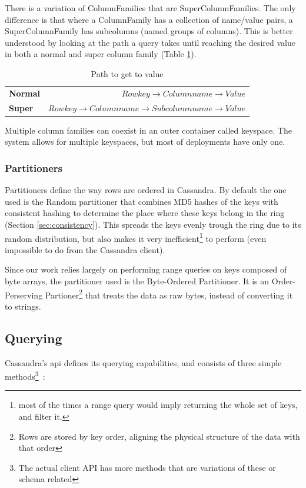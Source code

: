 There is a variation of ColumnFamilies that are SuperColumnFamilies. The only difference is that where a ColumnFamily has a collection of name/value pairs, a SuperColumnFamily has subcolumns (named groups of columns). This is better understood by looking at the path a query takes until reaching the desired value in both a normal and super column family (Table \ref{tab:path}).

\begin{table}[h!]
\centering
  \begin{tabular}{@{}p{4cm}  r@{}}
	\toprule
	\textbf{Normal} & $Row key \rightarrow Column name \rightarrow Value$\\
    \textbf{Super}  & $Row key \rightarrow Column name \rightarrow Subcolumn name \rightarrow Value$\\
    \bottomrule
  \end{tabular}

\caption{Path to get to value}
\label{tab:path}
\end{table}

Multiple column families can coexist in an outer container called keyspace. The system allows for multiple keyspaces, but most of deployments have only one.

\subsubsection{Partitioners}
\label{sec:partitioners}

Partitioners define the way rows are ordered in Cassandra. By default the one used is the Random partitioner that combines MD5 hashes of the keys with consistent hashing to determine the place where these keys belong in the ring (Section \ref{sec:consistency}). This spreads the keys evenly trough the ring due to its random distribution, but also makes it very inefficient\footnote{most of the times a range query would imply returning the whole set of keys, and filter it.} to perform (even impossible to do from the Cassandra client). 

Since our work relies largely on performing range queries on keys composed of byte arrays, the partitioner used is the Byte-Ordered Partitioner. It is an Order-Perserving Partioner\footnote{Rows are stored by key order, aligning the physical structure of the data with that order} that treats the data as raw bytes, instead of converting it to strings.    


\subsection{Querying}
Cassandra's \ac{api} defines its querying capabilities, and consists of three simple methods\footnote{The actual client API has more methods that are variations of these or schema related}~\cite{lakshmanMalik}:

